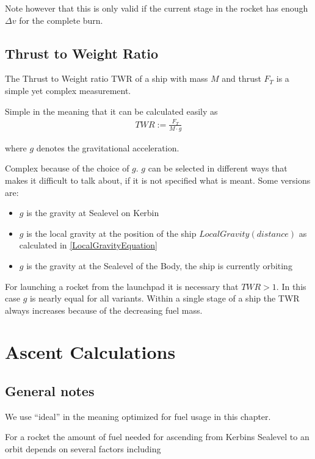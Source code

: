 \documentclass[11pt]{report}
\newcommand{\dv}{{\Delta}{v}}
\begin{document}
Note however that this is only valid if the current stage in the
rocket has enough $\dv$ for the complete burn.

\section{Thrust to Weight Ratio}

The Thrust to Weight ratio  TWR
\cite{KspTwr} of a ship with mass $M$ and thrust $F_T$ is a simple yet
complex measurement.

Simple in the meaning that it can be calculated easily
as
\begin{align}
  TWR := \frac{F_T}{M\cdot g}
\end{align}

where $g$ denotes the gravitational acceleration.

Complex because of the choice of $g$. $g$ can be selected in different
ways that makes it difficult to talk about, if it is not specified
what is meant. Some versions are:

\begin{itemize}
\item $g$ is the gravity at Sealevel on Kerbin
\item $g$ is the local gravity at the position of the ship
  $LocalGravity(distance)$ as calculated in
  \eqref{LocalGravityEquation}
\item $g$ is the gravity at the Sealevel of the Body, the ship is
  currently orbiting
\end{itemize}

For launching a rocket from the launchpad it is necessary that $TWR >
1$. In this case $g$ is nearly equal for all variants. Within a single
stage of a ship the TWR always increases because of the decreasing
fuel mass.

\chapter{Ascent Calculations}

\section{General notes}

We use ``ideal'' in the meaning optimized for fuel usage in this
chapter.

For a rocket the amount of fuel needed for ascending from Kerbins
Sealevel to an orbit depends on several factors including
\end{document}
